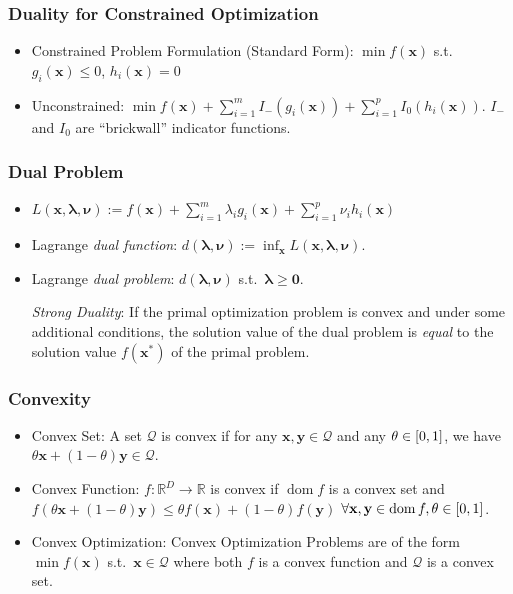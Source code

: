 \documentclass[11pt,a4paper,technote]{IEEEtran}
\newcommand{\vect}[1]{\boldsymbol{\mathbf{#1}}}
\newcommand{\set}[1]{\mathcal{#1}}
\DeclareMathOperator{\dom}{dom}
\newcommand{\from}{\colon}
\newcommand{\R}{\mathbb{R}}
\begin{document}
\subsubsection*{Duality for Constrained Optimization}
\begin{itemize}
  \item Constrained Problem Formulation (Standard Form): $\min f(\vect{x})$
    s.t.\ $g_i(\vect{x}) \leq 0$, $h_i(\vect{x}) = 0$
  \item Unconstrained: $\min f(\vect{x}) + \sum_{i=1}^m
    I_{-}(g_i(\vect{x})) + \sum_{i=1}^p I_{0}(h_i(\vect{x}))$. $I_{-}$ and $I_{0}$
    are ``brickwall'' indicator functions.
\end{itemize}

\subsubsection*{Dual Problem}
\begin{itemize}
  \item $L(\vect{x},\vect{\lambda},\vect{\nu}) := f(\vect{x}) +
    \sum_{i=1}^m \lambda_i g_i(\vect{x}) + \sum_{i=1}^p \nu_i h_i(\vect{x})$
  \item Lagrange \emph{dual function}: $d(\vect{\lambda},\vect{\nu}) :=
    \inf_{\vect{x}} L(\vect{x},\vect{\lambda},\vect{\nu})$.
  \item Lagrange \emph{dual problem}: $d(\vect{\lambda},\vect{\nu})$
    s.t.\ $\vect{\lambda} \geq \vect{0}$.


    \emph{Strong Duality}: If the primal optimization problem is convex
    and under some additional conditions, the solution value of the dual
    problem is \emph{equal} to the solution value $f(\vect{x}^*)$ of the
    primal problem.
\end{itemize}

\subsubsection*{Convexity}
\begin{itemize}
  \item Convex Set: A set $\set{Q}$ is convex if for any $\vect{x},\vect{y} \in
    \set{Q}$ and any $\theta\in\interval{0}{1}$, we have $\theta\vect{x} +
    (1-\theta) \vect{y} \in \set{Q}$.
  \item Convex Function: $f\from\R^D\to\R$ is convex if $\dom f$ is
    a convex set and $f(\theta\vect{x} + (1-\theta)\vect{y}) \leq \theta
    f(\vect{x}) + (1-\theta)f(\vect{y})$ $\forall \vect{x},\vect{y}\in\dom f,
    \theta\in\interval{0}{1}$.
  \item Convex Optimization: Convex Optimization Problems are of the form $\min
    f(\vect{x})$ s.t.\ $\vect{x}\in \set{Q}$ where both $f$ is a convex
    function and $\set{Q}$ is a convex set.
\end{itemize}
\end{document}
